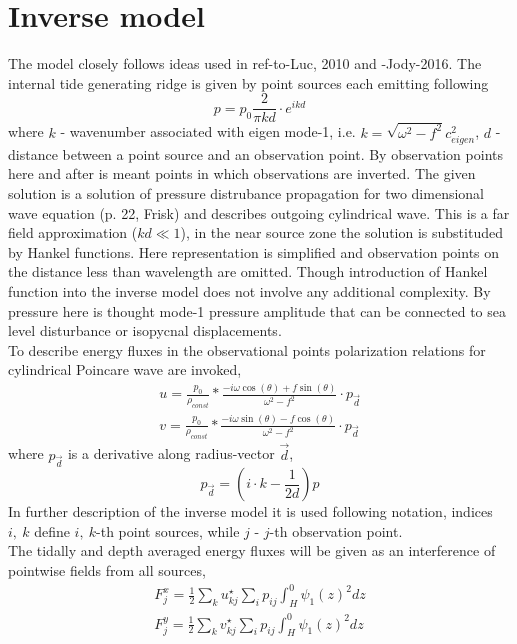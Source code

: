 \section{Inverse model}
The model closely follows ideas used in ref-to-Luc, 2010 and -Jody-2016. The internal tide generating ridge is given by point sources each emitting following
\begin{equation} \label{invm_eq:1}
p = p_{0} \frac{2}{\pi k d} \cdot e^{i  k  d}
\end{equation}
where $k$ - wavenumber associated with eigen mode-1, i.e. $k = \sqrt{\omega ^ 2 - f ^ 2}{c_{eigen} ^ 2}$, $d$ - distance between a point source and an observation point. By observation points here and after is meant points in which observations are inverted. The given solution is a solution of pressure distrubance propagation for two dimensional wave equation (p. 22, Frisk) and describes outgoing cylindrical wave. This is a far field approximation ($kd \ll 1$), in the near source zone the solution is substituded by Hankel functions. Here representation is simplified and observation points on the distance less than wavelength are omitted. Though introduction of Hankel function into the inverse model does not involve any additional complexity. By pressure here is thought mode-1 pressure amplitude that can be connected to sea level disturbance or isopycnal displacements.\\
To describe energy fluxes in the observational points polarization relations for cylindrical Poincare wave are invoked,
\begin{align} \label{invm_eq:2}
u = \frac{p_{0}}{\rho_{const}} * \frac{-i \omega \cos(\theta) + f \sin(\theta)}{\omega ^ 2 - f ^ 2} \cdot p_{\vec{d}}\\
v = \frac{p_{0}}{\rho_{const}} * \frac{-i \omega \sin(\theta) - f \cos(\theta)}{\omega ^ 2 - f ^ 2} \cdot p_{\vec{d}}
\end{align}
where $p_{\vec{d}}$ is a derivative along radius-vector $\vec{d}$,
\begin{equation}
p_{\vec{d}} = (i \cdot k - \frac{1}{2 d}) p
\end{equation}
In further description of the inverse model it is used following notation, indices $i,~k$ define $i,~k$-th point sources, while $j$ - $j$-th observation point.\\
The tidally and depth averaged energy fluxes will be given as an interference of pointwise fields from all sources,
\begin{align}
F_{j}^x = \frac{1}{2} \sum_k u_{kj}^{\star} \sum_i p_{ij} \int_H^0 \psi_1(z)^2 dz\\
F_{j}^y = \frac{1}{2} \sum_k v_{kj}^{\star} \sum_i p_{ij} \int_H^0 \psi_1(z)^2 dz
\end{align}
